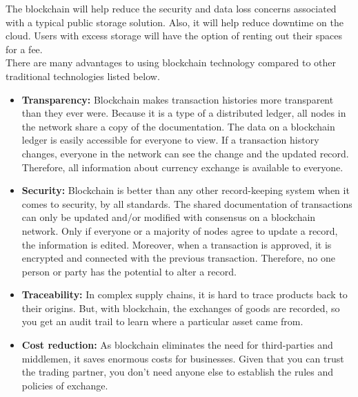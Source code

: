 The blockchain will help reduce the security and data loss concerns associated with a typical public storage solution. Also, it will help reduce downtime on the cloud. Users with excess storage will have the option of renting out their spaces for a fee. \\[-8pt]

\noindent
There are many advantages to using blockchain technology compared to other traditional technologies listed below. \\

\begin{itemize}
\item \textbf{Transparency: } Blockchain makes transaction histories more transparent than they ever were. Because it is a type of a distributed ledger, all nodes in the network share a copy of the documentation.  The data on a blockchain ledger is easily accessible for everyone to view. If a transaction history changes, everyone in the network can see the change and the updated record. Therefore, all information about currency exchange is available to everyone. \\
\item \textbf{Security: } Blockchain is better than any other record-keeping system when it comes to security, by all standards. The shared documentation of transactions can only be updated and/or modified with consensus on a blockchain network. Only if everyone or a majority of nodes agree to update a record, the information is edited. Moreover, when a transaction is approved, it is encrypted and connected with the previous transaction. Therefore, no one person or party has the potential to alter a record.\\
\item \textbf{Traceability: } In complex supply chains, it is hard to trace products back to their origins. But, with blockchain, the exchanges of goods are recorded, so you get an audit trail to learn where a particular asset came from.\\
\item \textbf{Cost reduction: } As blockchain eliminates the need for third-parties and middlemen, it saves enormous costs for businesses. Given that you can trust the trading partner, you don’t need anyone else to establish the rules and policies of exchange.\\
\end{itemize}
